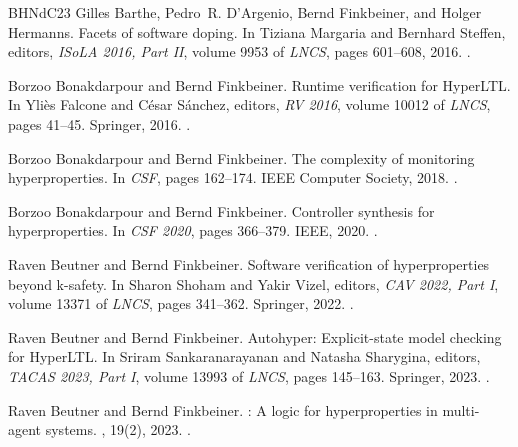 \documentclass[dvipsnames,10pt,a4paper]{amsart}
\theoremstyle{definition}
\theoremstyle{remark}
\begin{document}
\begin{thebibliography}{BHNdC23}
Gilles Barthe, Pedro~R. D'Argenio, Bernd Finkbeiner, and Holger Hermanns.
\newblock Facets of software doping.
\newblock In Tiziana Margaria and Bernhard Steffen, editors, {\em {ISoLA} 2016, Part {II}}, volume 9953 of {\em LNCS}, pages 601--608, 2016.
\newblock \href {https://doi.org/10.1007/978-3-319-47169-3\_46} {}.

Borzoo Bonakdarpour and Bernd Finkbeiner.
\newblock Runtime verification for {HyperLTL}.
\newblock In Yli{\`{e}}s Falcone and C{\'{e}}sar S{\'{a}}nchez, editors, {\em {RV} 2016}, volume 10012 of {\em LNCS}, pages 41--45. Springer, 2016.
\newblock \href {https://doi.org/10.1007/978-3-319-46982-9\_4} {}.

Borzoo Bonakdarpour and Bernd Finkbeiner.
\newblock The complexity of monitoring hyperproperties.
\newblock In {\em {CSF}}, pages 162--174. {IEEE} Computer Society, 2018.
\newblock \href {https://doi.org/10.1109/CSF.2018.00019} {}.

Borzoo Bonakdarpour and Bernd Finkbeiner.
\newblock Controller synthesis for hyperproperties.
\newblock In {\em {CSF} 2020}, pages 366--379. {IEEE}, 2020.
\newblock \href {https://doi.org/10.1109/CSF49147.2020.00033} {}.

Raven Beutner and Bernd Finkbeiner.
\newblock Software verification of hyperproperties beyond k-safety.
\newblock In Sharon Shoham and Yakir Vizel, editors, {\em {CAV} 2022, Part {I}}, volume 13371 of {\em LNCS}, pages 341--362. Springer, 2022.
\newblock \href {https://doi.org/10.1007/978-3-031-13185-1\_17} {}.

Raven Beutner and Bernd Finkbeiner.
\newblock Autohyper: Explicit-state model checking for {HyperLTL}.
\newblock In Sriram Sankaranarayanan and Natasha Sharygina, editors, {\em {TACAS} 2023, Part {I}}, volume 13993 of {\em LNCS}, pages 145--163. Springer, 2023.
\newblock \href {https://doi.org/10.1007/978-3-031-30823-9\_8} {}.

Raven Beutner and Bernd Finkbeiner.
: {A} logic for hyperproperties in multi-agent systems.
, 19(2), 2023.
\newblock \href {https://doi.org/10.46298/LMCS-19(2:13)2023} {}.


\end{thebibliography}
\end{document}
